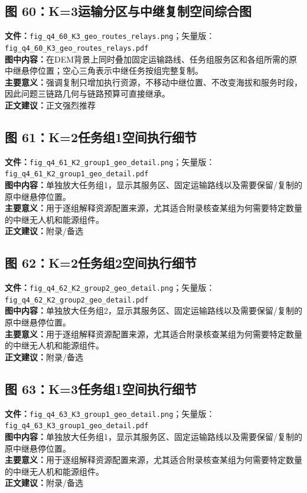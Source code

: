 \subsection*{图 60：K=3运输分区与中继复制空间综合图}
\textbf{文件：}\texttt{fig\_q4\_60\_K3\_geo\_routes\_relays.png}；矢量版：\texttt{fig\_q4\_60\_K3\_geo\_routes\_relays.pdf}\\
\textbf{图中内容：}在DEM背景上同时叠加固定运输路线、任务组服务区和各组所需的原中继悬停位置；空心三角表示中继任务按组完整复制。\\
\textbf{主要意义：}强调复制只增加执行资源，不移动中继位置、不改变海拔和服务时段，因此问题三链路几何与链路预算可直接继承。\\
\textbf{正文建议：}正文强烈推荐

\subsection*{图 61：K=2任务组1空间执行细节}
\textbf{文件：}\texttt{fig\_q4\_61\_K2\_group1\_geo\_detail.png}；矢量版：\texttt{fig\_q4\_61\_K2\_group1\_geo\_detail.pdf}\\
\textbf{图中内容：}单独放大任务组1，显示其服务区、固定运输路线以及需要保留/复制的原中继悬停位置。\\
\textbf{主要意义：}用于逐组解释资源配置来源，尤其适合附录核查某组为何需要特定数量的中继无人机和能源组件。\\
\textbf{正文建议：}附录/备选

\subsection*{图 62：K=2任务组2空间执行细节}
\textbf{文件：}\texttt{fig\_q4\_62\_K2\_group2\_geo\_detail.png}；矢量版：\texttt{fig\_q4\_62\_K2\_group2\_geo\_detail.pdf}\\
\textbf{图中内容：}单独放大任务组2，显示其服务区、固定运输路线以及需要保留/复制的原中继悬停位置。\\
\textbf{主要意义：}用于逐组解释资源配置来源，尤其适合附录核查某组为何需要特定数量的中继无人机和能源组件。\\
\textbf{正文建议：}附录/备选

\subsection*{图 63：K=3任务组1空间执行细节}
\textbf{文件：}\texttt{fig\_q4\_63\_K3\_group1\_geo\_detail.png}；矢量版：\texttt{fig\_q4\_63\_K3\_group1\_geo\_detail.pdf}\\
\textbf{图中内容：}单独放大任务组1，显示其服务区、固定运输路线以及需要保留/复制的原中继悬停位置。\\
\textbf{主要意义：}用于逐组解释资源配置来源，尤其适合附录核查某组为何需要特定数量的中继无人机和能源组件。\\
\textbf{正文建议：}附录/备选

